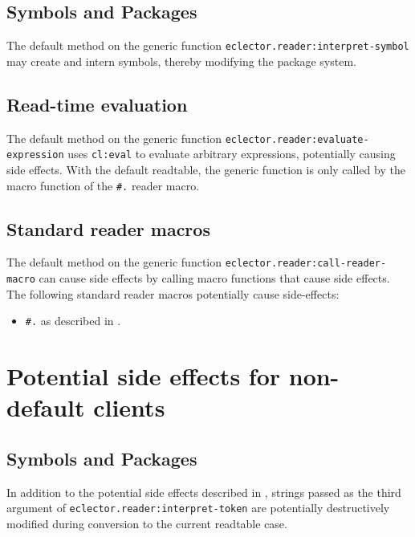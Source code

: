 \subsection{Symbols and Packages}
\label{sec:default-symbols-and-packages}

The default method on the generic function
\texttt{eclector.reader:interpret-symbol} may create and intern
symbols, thereby modifying the package system.

\subsection{Read-time evaluation}
\label{sec:default-read-time-evaluation}

The default method on the generic function
\texttt{eclector.reader:evaluate-expression} uses \texttt{cl:eval} to
evaluate arbitrary expressions, potentially causing side effects.
With the default readtable, the generic function is only called by the
macro function of the \texttt{\#.} reader macro.

\subsection{Standard reader macros}
\label{sec:default-standard-reader-macros}

The default method on the generic function
\texttt{eclector.reader:call-reader-macro} can cause side effects by
calling macro functions that cause side effects.  The following
standard reader macros potentially cause side-effects:

\begin{itemize}
\item \texttt{\#.} as described in .
\end{itemize}

\section{Potential side effects for non-default clients}
\label{sec:side-effects-non-default-clients}

\subsection{Symbols and Packages}
\label{sec:non-default-symbols-and-packages}

In addition to the potential side effects described in
, strings passed as the third
argument of \texttt{eclector.reader:interpret-token} are potentially
destructively modified during conversion to the current readtable
case.

